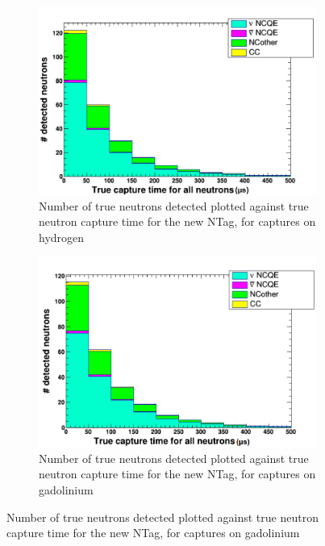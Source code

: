 \begin{figure}
    \centering
     \begin{subfigure}[b]{0.45\linewidth}
      \includegraphics[width=\linewidth]{Figures/TruCapTimeReductionNewH.PNG}
      \caption{Number of true neutrons detected plotted against true neutron capture time for the new NTag, for captures on hydrogen}
      \label{fig:TruCapTimeReductionNewH} 
     \end{subfigure}
     \begin{subfigure}[b]{0.45\linewidth}
       \includegraphics[width=\linewidth]{Figures/TruCapTimeReductionNewGd.PNG}
        \caption{Number of true neutrons detected plotted against true neutron capture time for the new NTag, for captures on gadolinium} 
     \label{fig:TruCapTimeReductionNewGd}
      \end{subfigure} 
\end{figure}


